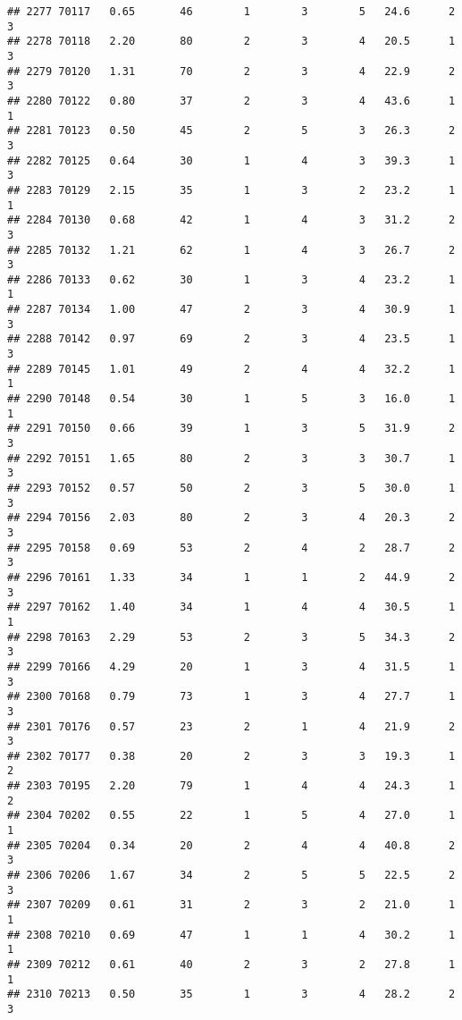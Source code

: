 \documentclass[
]{article}
\begin{document}
\begin{verbatim}
## 2277 70117   0.65       46        1        3        5   24.6      2      3
## 2278 70118   2.20       80        2        3        4   20.5      1      3
## 2279 70120   1.31       70        2        3        4   22.9      2      3
## 2280 70122   0.80       37        2        3        4   43.6      1      1
## 2281 70123   0.50       45        2        5        3   26.3      2      3
## 2282 70125   0.64       30        1        4        3   39.3      1      3
## 2283 70129   2.15       35        1        3        2   23.2      1      1
## 2284 70130   0.68       42        1        4        3   31.2      2      3
## 2285 70132   1.21       62        1        4        3   26.7      2      3
## 2286 70133   0.62       30        1        3        4   23.2      1      1
## 2287 70134   1.00       47        2        3        4   30.9      1      3
## 2288 70142   0.97       69        2        3        4   23.5      1      3
## 2289 70145   1.01       49        2        4        4   32.2      1      1
## 2290 70148   0.54       30        1        5        3   16.0      1      1
## 2291 70150   0.66       39        1        3        5   31.9      2      3
## 2292 70151   1.65       80        2        3        3   30.7      1      3
## 2293 70152   0.57       50        2        3        5   30.0      1      3
## 2294 70156   2.03       80        2        3        4   20.3      2      3
## 2295 70158   0.69       53        2        4        2   28.7      2      3
## 2296 70161   1.33       34        1        1        2   44.9      2      3
## 2297 70162   1.40       34        1        4        4   30.5      1      1
## 2298 70163   2.29       53        2        3        5   34.3      2      3
## 2299 70166   4.29       20        1        3        4   31.5      1      3
## 2300 70168   0.79       73        1        3        4   27.7      1      3
## 2301 70176   0.57       23        2        1        4   21.9      2      3
## 2302 70177   0.38       20        2        3        3   19.3      1      2
## 2303 70195   2.20       79        1        4        4   24.3      1      2
## 2304 70202   0.55       22        1        5        4   27.0      1      1
## 2305 70204   0.34       20        2        4        4   40.8      2      3
## 2306 70206   1.67       34        2        5        5   22.5      2      3
## 2307 70209   0.61       31        2        3        2   21.0      1      1
## 2308 70210   0.69       47        1        1        4   30.2      1      1
## 2309 70212   0.61       40        2        3        2   27.8      1      1
## 2310 70213   0.50       35        1        3        4   28.2      2      3

\end{verbatim}
\end{document}
